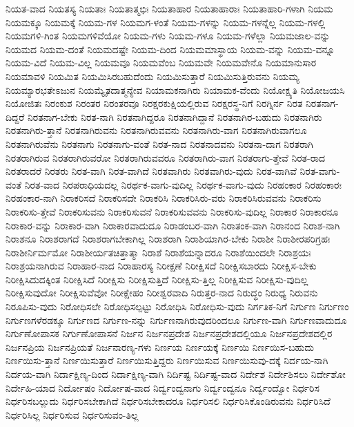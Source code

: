 {ನಿಯತ-ವಾದ
ನಿಯತಸ್ಯ
ನಿಯತಾಃ
ನಿಯತಾತ್ಮಭಿಃ
ನಿಯತಾಹಾರ
ನಿಯತಾಹಾರಾಃ
ನಿಯತಾಹಾರಿ-ಗಳಾಗಿ
ನಿಯಮ
ನಿಯಮಕ್ಕೂ
ನಿಯಮಕ್ಕೆ
ನಿಯಮ-ಗಳ
ನಿಯಮಗ-ಳಂತೆ
ನಿಯಮ-ಗಳನ್ನು
ನಿಯಮ-ಗಳನ್ನೆಲ್ಲ
ನಿಯಮ-ಗಳಲ್ಲಿ
ನಿಯಮಗಳಿ-ಗಿಂತ
ನಿಯಮಗಳಿವೆಯೋ
ನಿಯಮ-ಗಳು
ನಿಯಮ-ಗಳೂ
ನಿಯಮ-ಗಳೆಲ್ಲಾ
ನಿಯಮಜಾಲ-ವನ್ನು
ನಿಯಮದ
ನಿಯಮ-ದಂತೆ
ನಿಯಮದಷ್ಟೇ
ನಿಯಮ-ದಿಂದ
ನಿಯಮಮಾಸ್ಥಾಯ
ನಿಯಮ-ವನ್ನು
ನಿಯಮ-ವನ್ನೂ
ನಿಯಮ-ವಿದೆ
ನಿಯಮ-ವಿಲ್ಲ
ನಿಯಮವೂ
ನಿಯಮವೆಂಬ
ನಿಯಮವೇ
ನಿಯಮವೇನೊ
ನಿಯಮಾನುಸಾರ
ನಿಯಮಾವಳಿ
ನಿಯಮಿತ
ನಿಯಮಿಸಿರಬಹುದೆಂದು
ನಿಯಮಿಸುತ್ತಾರೆ
ನಿಯಮಿಸುತ್ತಿರುವನು
ನಿಯಮ್ಯ
ನಿಯಮ್ಯಾರಭತೇಽಜುನ
ನಿಯಮ್ಯೈತದಾತ್ಮನ್ಯೇವ
ನಿಯಾಮಕನಾಗಿರು
ನಿಯಾಮಕ-ವೆಂದು
ನಿಯೋಕ್ಷ್ಯತಿ
ನಿಯೋಜಯಸಿ
ನಿಯೋಜಿತಃ
ನಿರಂಕುಶ
ನಿರಂತರ
ನಿರಂತರವೂ
ನಿರಕ್ಷರಕುಕ್ಷಿಯಲ್ಲಿರುವ
ನಿರಕ್ಷರಸ್ಥ-ನಿಗೆ
ನಿರಗ್ನಿರ್ನ
ನಿರತ
ನಿರತನಾಗ-ದಿದ್ದರೆ
ನಿರತನಾಗ-ಬೇಕು
ನಿರತ-ನಾಗಿ
ನಿರತನಾಗಿದ್ದರೂ
ನಿರತನಾಗಿದ್ದಾನೆ
ನಿರತನಾಗಿರ-ಬಹುದು
ನಿರತನಾಗಿರು
ನಿರತನಾಗಿರು-ತ್ತಾನೆ
ನಿರತನಾಗಿರುವನು
ನಿರತನಾಗಿರುವವನು
ನಿರತನಾಗಿರು-ವಾಗ
ನಿರತನಾಗಿರುವಾಗಲೂ
ನಿರತನಾಗಿರುವೆನು
ನಿರತನಾಗು
ನಿರತನಾಗು-ವಂತೆ
ನಿರತ-ನಾದ
ನಿರತನಾದವನು
ನಿರತನಾ-ದಾಗ
ನಿರತರಾಗಿ
ನಿರತರಾಗಿರುವ
ನಿರತರಾಗಿರುವರೋ
ನಿರತರಾಗಿರುವವರೂ
ನಿರತರಾಗಿರು-ವಾಗ
ನಿರತರಾಗು-ತ್ತೇವೆ
ನಿರತ-ರಾದ
ನಿರತರಾದರೆ
ನಿರತರು
ನಿರತ-ವಾಗಿ
ನಿರತ-ವಾಗಿದೆ
ನಿರತವಾಗಿರು
ನಿರತವಾಗಿರು-ವುದು
ನಿರತ-ವಾಗಿವೆ
ನಿರತ-ವಾಗು-ವಂತೆ
ನಿರತ-ವಾದ
ನಿರಪರಾಧಿಯದಲ್ಲ
ನಿರರ್ಥಕ-ವಾಗು-ವುದಿಲ್ಲ
ನಿರರ್ಥಕ-ವಾಗು-ವುದು
ನಿರಹಂಕಾರ
ನಿರಹಂಕಾರಃ
ನಿರಹಂಕಾರ-ನಾಗಿ
ನಿರಾಕರಿಸದೆ
ನಿರಾಕರಿಸದೇ
ನಿರಾಕರಿಸಿ
ನಿರಾಕರಿಸಿರು-ವರು
ನಿರಾಕರಿಸಿರುವವನು
ನಿರಾಕರಿಸು
ನಿರಾಕರಿಸು-ತ್ತೇವೆ
ನಿರಾಕರಿಸುವನು
ನಿರಾಕರಿಸುವನೆ
ನಿರಾಕರಿಸುವವನು
ನಿರಾಕರಿಸು-ವುದಿಲ್ಲ
ನಿರಾಕಾರ
ನಿರಾಕಾರನೂ
ನಿರಾಕಾರ-ವನ್ನು
ನಿರಾಕಾರ-ವಾಗಿ
ನಿರಾಕಾರವಾದುದೂ
ನಿರಾಡಂಬರ-ವಾಗಿ
ನಿರಾತಂಕ-ವಾಗಿ
ನಿರಾನಂದ
ನಿರಾಶ-ನಾಗಿ
ನಿರಾಶನೂ
ನಿರಾಶರಾಗದೆ
ನಿರಾಶರಾಗಬೇಕಾಗಿಲ್ಲ
ನಿರಾಶರಾಗಿ
ನಿರಾಶಿಯಾಗಿರ-ಬೇಕು
ನಿರಾಶೀ
ನಿರಾಶೀರಪರಿಗ್ರಹಃ
ನಿರಾಶೀರ್ನಿರ್ಮಮೋ
ನಿರಾಶೀರ್ಯತಚಿತ್ತಾತ್ಮಾ
ನಿರಾಶೆ
ನಿರಾಶೆಯನ್ನಾದರೂ
ನಿರಾಶೆಯಿಂದಲೇ
ನಿರಾಶ್ರಯಃ
ನಿರಾಶ್ರಯನಾಗಿರುವ
ನಿರಾಹಾರ-ನಾದ
ನಿರಾಹಾರಸ್ಯ
ನಿರೀಕ್ಷಣೆ
ನಿರೀಕ್ಷಿಸದೆ
ನಿರೀಕ್ಷಿಸಬಾರದು
ನಿರೀಕ್ಷಿಸ-ಬೇಕು
ನಿರೀಕ್ಷಿಸಿದುದಕ್ಕಿಂತ
ನಿರೀಕ್ಷಿಸಿದೆ
ನಿರೀಕ್ಷಿಸು
ನಿರೀಕ್ಷಿಸುತ್ತಿದೆ
ನಿರೀಕ್ಷಿಸು-ತ್ತಿಲ್ಲ
ನಿರೀಕ್ಷಿಸುವ
ನಿರೀಕ್ಷಿಸು-ವುದಿಲ್ಲ
ನಿರೀಕ್ಷಿಸುವುದೋ
ನಿರೀಕ್ಷಿಸುವೆವೋ
ನಿರೀಕ್ಷೇಹಂ
ನಿರೀಶ್ವರವಾದಿ
ನಿರುತ್ತರ-ನಾದ
ನಿರುದ್ಧಂ
ನಿರುಧ್ಯ
ನಿರುವನು
ನಿರೂಪಿಸು-ವುದು
ನಿರೋಧಿಸಲೇ
ನಿರೋಧಿಸಲ್ಪಟ್ಟು
ನಿರೋಧಿಸಿ
ನಿರೋಧಿಸು-ವುದು
ನಿರ್ಗತಿಕ-ನಿಗೆ
ನಿರ್ಗುಣ
ನಿರ್ಗುಣಂ
ನಿರ್ಗುಣಗಳೆರಡಕ್ಕೂ
ನಿರ್ಗುಣದ
ನಿರ್ಗುಣ-ನನ್ನು
ನಿರ್ಗುಣನಾಗಿರುವುದರಿಂದಲೂ
ನಿರ್ಗುಣ-ವಾಗಿ
ನಿರ್ಗುಣವಾದುದೂ
ನಿರ್ಗುಣೋಪಾಸಕ
ನಿರ್ಗುಣೋಪಾಸನೆ
ನಿರ್ಜನ
ನಿರ್ಜನಪ್ರದೇಶ
ನಿರ್ಜನಪ್ರದೇಶದಲ್ಲಿಯೂ
ನಿರ್ಜನಪ್ರದೇಶದಲ್ಲಿರ
ನಿರ್ಜನಪ್ರಿಯ
ನಿರ್ಜನಪ್ರಿಯತೆ
ನಿರ್ಜನಾರಣ್ಯ-ಗಳು
ನಿರ್ಣಯ
ನಿರ್ಣಯಕ್ಕೆ
ನಿರ್ಣಯಿ
ನಿರ್ಣಯಿಸ-ಬಹುದು
ನಿರ್ಣಯಿಸು-ತ್ತಾನೆ
ನಿರ್ಣಯಿಸುತ್ತಾರೆ
ನಿರ್ಣಯಿಸುತ್ತಿದ್ದರು
ನಿರ್ಣಯಿಸುವ
ನಿರ್ಣಯಿಸುವು-ದಕ್ಕೆ
ನಿರ್ದಯ-ನಾಗಿ
ನಿರ್ದಯ-ವಾಗಿ
ನಿರ್ದಾಕ್ಷಿಣ್ಯ-ದಿಂದ
ನಿರ್ದಾಕ್ಷಿಣ್ಯ-ವಾಗಿ
ನಿರ್ದಿಷ್ಟ
ನಿರ್ದಿಷ್ಟ-ವಾದ
ನಿರ್ದೇಶ
ನಿರ್ದೇಶಿಸಲು
ನಿರ್ದೇಶೋ
ನಿರ್ದೇಹಿ-ಯಾದ
ನಿರ್ದೋಷಂ
ನಿರ್ದೋಷ-ವಾದ
ನಿರ್ದ್ವಂದ್ವನಾಗು
ನಿರ್ದ್ವಂದ್ವನೂ
ನಿರ್ದ್ವಂದ್ವೋ
ನಿರ್ಧರಿಸ
ನಿರ್ಧರಿಸಬಲ್ಲುದು
ನಿರ್ಧರಿಸಬೇಕಾಗಿದೆ
ನಿರ್ಧರಿಸಬೇಕಾದರೂ
ನಿರ್ಧರಿಸಲಿ
ನಿರ್ಧರಿಸಿಕೊಂಡಿರುವನು
ನಿರ್ಧರಿಸಿದೆ
ನಿರ್ಧರಿಸಿಲ್ಲ
ನಿರ್ಧರಿಸುವ
ನಿರ್ಧರಿಸುವಂ-ತಿಲ್ಲ
}
